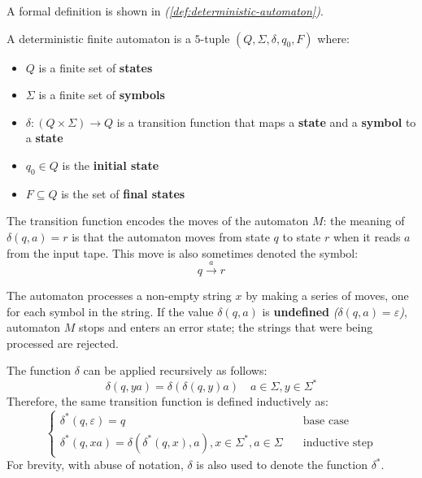 \documentclass[english]{article}
\begin{document}
A formal definition is shown in \textit{(\ref{def:deterministic-automaton})}.

\begin{definition}
  \label{def:deterministic-automaton}

  A deterministic finite automaton is a \(5\)-tuple \((Q, \Sigma, \delta, q_0, F)\) where:

  \begin{itemize}
    \item \(Q\) is a finite set of \textbf{states}
    \item \(\Sigma\) is a finite set of \textbf{symbols}
    \item \(\delta: \left( Q \times \Sigma \right) \rightarrow Q\) is a transition function that maps a \textbf{state} and a \textbf{symbol} to a \textbf{state}
    \item \(q_0 \in Q\) is the\textbf{ initial state}
    \item \(F \subseteq Q\) is the set of \textbf{final states}
  \end{itemize}
\end{definition}

The transition function encodes the moves of the automaton \(M\): the meaning of \(\delta(q, a) = r\) is that the automaton moves from state \(q\) to state \(r\) when it reads \(a\) from the input tape.
This move is also sometimes denoted the symbol: \[q \xrightarrow{a} r\]

The automaton processes a non-empty string \(x\) by making a series of moves, one for each symbol in the string.
If the value \(\delta(q, a)\) is \textbf{undefined} \textit{(\(\delta(q, a) = \varepsilon\))}, automaton \(M\) stops and enters an error state;
the strings that were being processed are rejected.

The function \(\delta\) can be applied recursively as follows:
\[ \delta(q, ya) = \delta \left(  \delta \left( q, y \right) a \right) \quad a \in \Sigma, y \in \Sigma^\ast \]
Therefore, the same transition function is defined inductively as:
\[\begin{cases}
    \delta^\ast\left( q, \varepsilon \right) = q \quad                                                                   & \text{base case}      \\
    \delta^\ast\left( q, xa \right) = \delta \left( \delta^\ast (q, x), a \right), x \in \Sigma^\ast, a \in \Sigma \quad & \text{inductive step}
  \end{cases}\]
For brevity, with abuse of notation, \(\delta\) is also used to denote the function \(\delta^\ast\).
\end{document}
